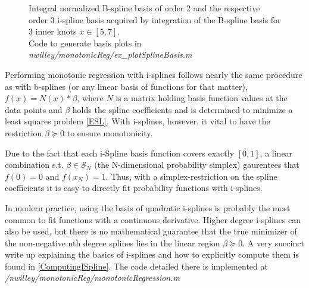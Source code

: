 \documentclass{article}
\begin{document}
	\begin{figure}[h]
		\label{basisPlots}
		\centering
		\qquad
		\caption{Integral normalized B-spline basis of order 2 and the respective order 3 i-spline basis acquired by integration of the B-spline basis for 3 inner knots $x \in [5,7]$. \\
		Code to generate basis plots in \textit{nwilley/monotonicReg/ex\_plotSplineBasis.m}}%
		\label{fig:example}%
	\end{figure}
	
	Performing monotonic regression with i-splines follows nearly the same procedure as with b-splines (or any linear basis of functions for that matter), $f(x) = N(x)*\beta$, where $N$ is a matrix holding basis function values at the data points and $\beta$ holds the spline coefficients and is determined to minimize a least squares problem \ref{ESL}. With i-splines, however, it vital to have the restriction $\beta \succeq 0$ to ensure monotonicity.
	
	Due to the fact that each i-Spline basis function covers exactly $[0,1]$, a linear combination s.t. $\beta \in \mathcal{S}_N$ (the N-dimensional probability simplex) gaurentees that $f(0) = 0$ and $f(x_N) = 1$. Thus, with a simplex-restriction on the spline coefficients it is easy to directly fit probability functions with i-splines.
	
	In modern practice, using the basis of quadratic i-splines is probably the most common to fit functions with a continuous derivative. Higher degree i-splines can also be used, but there is no mathematical guarantee that the true minimizer of the non-negative nth degree splines lies in the linear region $\beta \succeq 0$. A very succinct write up explaining the basics of i-splines and how to explicitly compute them is found in \ref{ComputingISpline}. The code detailed there is implemented at \textit{/nwilley/monotonicReg/monotonicRegression.m}
	
\end{document}
